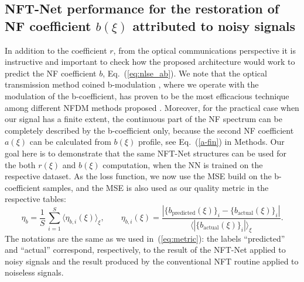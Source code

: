 \subsection{NFT-Net performance for the restoration of NF coefficient $b(\xi)$ attributed to noisy signals}
In addition to the coefficient $r$, from the optical communications perspective it is instructive and important to check how the proposed architecture would work to predict the NF coefficient $b$, Eq.~(\ref{eq:nlse_ab}). We note that the optical transmission method coined b-modulation \cite{w17,wsh20,svp20}, where we operate with the modulation of the b-coefficient, has proven to be the most efficacious technique among different NFDM methods proposed \cite{yal19,yla19}. Moreover, for the practical case when our signal has a finite extent, the continuous part of the NF spectrum can be completely described by the b-coefficient only, because the second NF coefficient $a(\xi)$ can be calculated from $b(\xi)$ profile, see Eq.~(\ref{a-fin}) in Methods. Our goal here is to demonstrate that the same NFT-Net structures can be used for the both $r(\xi)$ and $b(\xi)$ computation, when the NN is trained on the respective dataset. As the loss function, we now use the MSE build on the b-coefficient samples, and the MSE is also used as our quality metric in the respective tables:
\begin{equation}
    \eta_b = \frac{1}{S} \, \sum_{i = 1}^{S} \langle \eta_{b,i}(\xi) \rangle_{\xi}, 
    \qquad 
    \eta_{b,i}(\xi) = \frac{|\{b_\text{predicted}(\xi)\}_i - \{b_\text{actual}(\xi)\}_i| }{\langle |\{b_\text{actual}(\xi)\}_i| \rangle_{\xi}}.
    \label{eq:b_metric}
\end{equation}
The notations are the same as we used in~(\ref{eq:metric}): the labels ``predicted'' and ``actual'' correspond, respectively, to the result of the NFT-Net applied to noisy signals and the result produced by the conventional NFT routine applied to noiseless signals.

